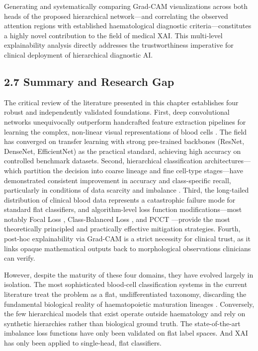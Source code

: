 \documentclass[11pt]{article}
\begin{document}
Generating and systematically comparing Grad-CAM visualizations across both heads of the proposed hierarchical network—and correlating the observed attention regions with established haematological diagnostic criteria—constitutes a highly novel contribution to the field of medical XAI. This multi-level explainability analysis directly addresses the trustworthiness imperative for clinical deployment of hierarchical diagnostic AI.

\subsection*{2.7 Summary and Research Gap}

The critical review of the literature presented in this chapter establishes four robust and independently validated foundations. First, deep convolutional networks unequivocally outperform handcrafted feature extraction pipelines for learning the complex, non-linear visual representations of blood cells \cite{matek2021,alam2022,erten2025,moran2022}. The field has converged on transfer learning with strong pre-trained backbones (ResNet, DenseNet, EfficientNet) as the practical standard, achieving high accuracy on controlled benchmark datasets. Second, hierarchical classification architectures—which partition the decision into coarse lineage and fine cell-type stages—have demonstrated consistent improvement in accuracy and class-specific recall, particularly in conditions of data scarcity and imbalance \cite{an2021,kowsari2020,moran2022}. Third, the long-tailed distribution of clinical blood data represents a catastrophic failure mode for standard flat classifiers, and algorithm-level loss function modifications—most notably Focal Loss \cite{lin2017}, Class-Balanced Loss \cite{cui2019}, and PCCT \cite{chen2023}—provide the most theoretically principled and practically effective mitigation strategies. Fourth, post-hoc explainability via Grad-CAM \cite{selvaraju2017,islam2024} is a strict necessity for clinical trust, as it links opaque mathematical outputs back to morphological observations clinicians can verify.

However, despite the maturity of these four domains, they have evolved largely in isolation. The most sophisticated blood-cell classification systems in the current literature treat the problem as a flat, undifferentiated taxonomy, discarding the fundamental biological reality of haematopoietic maturation lineages \cite{wang2024}. Conversely, the few hierarchical models that exist operate outside haematology and rely on synthetic hierarchies rather than biological ground truth. The state-of-the-art imbalance loss functions have only been validated on flat label spaces. And XAI has only been applied to single-head, flat classifiers.
\end{document}
